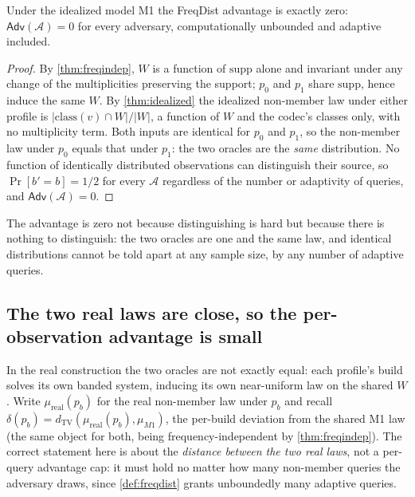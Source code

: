 \documentclass[sigconf,nonacm,anonymous,balance=false]{acmart}
\newcommand{\TV}{d_{\mathrm{TV}}}
\newcommand{\class}{\mathrm{class}}
\newcommand{\W}{W}                          %
\newcommand{\supp}{\mathrm{supp}}           %
\newcommand{\Adv}{\mathsf{Adv}}             %
\newcommand{\lawreal}{\mu_{\mathrm{real}}}  %
\newcommand{\lawM}{\mu_{M1}}                %
\newcommand{\inter}{\cap}
\begin{document}
\begin{theorem}
\label{thm:freqdist-ideal}
Under the idealized model M1 the FreqDist advantage is exactly zero:
$\Adv(\mathcal{A}) = 0$ for every adversary, computationally unbounded and adaptive
included.
\end{theorem}

\begin{proof}
By \cref{thm:freqindep}, $\W$ is a function of $\supp$ alone and invariant under any
change of the multiplicities preserving the support; $p_0$ and $p_1$ share $\supp$, hence
induce the same $\W$. By \cref{thm:idealized} the idealized non-member law under either
profile is $|\class(v) \inter \W|/|\W|$, a function of $\W$ and the codec's classes only,
with no multiplicity term. Both inputs are identical for $p_0$ and $p_1$, so the
non-member law under $p_0$ equals that under $p_1$: the two oracles are the \emph{same}
distribution. No function of identically distributed observations can distinguish their
source, so $\Pr[b' = b] = 1/2$ for every $\mathcal{A}$ regardless of the number or
adaptivity of queries, and $\Adv(\mathcal{A}) = 0$.
\end{proof}

The advantage is zero not because distinguishing is hard but because there is nothing to
distinguish: the two oracles are one and the same law, and identical distributions cannot
be told apart at any sample size, by any number of adaptive queries.

\subsection{The two real laws are close, so the per-observation advantage is small}

In the real construction the two oracles are not exactly equal: each profile's build
solves its own banded system, inducing its own near-uniform law on the shared $\W$. Write
$\lawreal(p_b)$ for the real non-member law under $p_b$ and recall
$\delta(p_b) = \TV(\lawreal(p_b), \lawM)$, the per-build deviation from the shared M1 law
(the same object for both, being frequency-independent by \cref{thm:freqindep}). The
correct statement here is about the \emph{distance between the two real laws}, not a
per-query advantage cap: it must hold no matter how many non-member queries the adversary
draws, since \cref{def:freqdist} grants unboundedly many adaptive queries.
\end{document}
